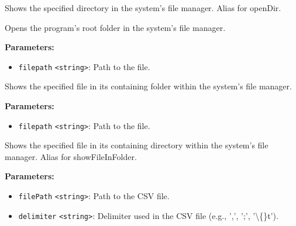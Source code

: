 \documentclass[12pt,a4paper]{article}
\begin{document}
\noindent Shows the specified directory in the system's file manager. Alias for \textasciigrave{}openDir\textasciigrave{}.

\vspace{5mm}
\noindent {}


\noindent Opens the program's root folder in the system's file manager.

\vspace{5mm}
\noindent {}


\noindent \textbf{Parameters:}
\begin{itemize}
  \item \texttt{filepath} \texttt{<string>}: Path to the file.
\end{itemize}

\noindent Shows the specified file in its containing folder within the system's file manager.

\vspace{5mm}
\noindent {}


\noindent \textbf{Parameters:}
\begin{itemize}
  \item \texttt{filepath} \texttt{<string>}: Path to the file.
\end{itemize}

\noindent Shows the specified file in its containing directory within the system's file manager. Alias for \textasciigrave{}showFileInFolder\textasciigrave{}.

\vspace{5mm}
\noindent {}


\noindent \textbf{Parameters:}
\begin{itemize}
  \item \texttt{filePath} \texttt{<string>}: Path to the CSV file.
  \item \texttt{delimiter} \texttt{<string>}: Delimiter used in the CSV file (e.g., ',', ';', '\textbackslash\{\}t').
\end{itemize}
\end{document}

